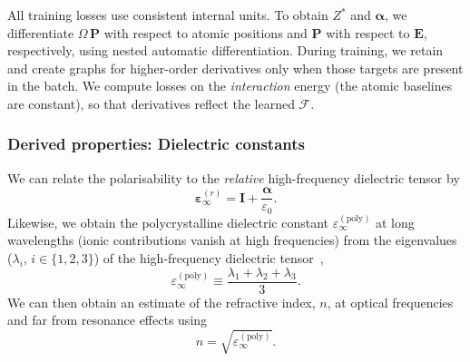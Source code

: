 \documentclass[aps,physrev,graphicx,amsmath,amssymb,
               reprint,superscriptaddress]{revtex4-2}
\begin{document}
All training losses use consistent internal units. To obtain $Z^*$ and $\boldsymbol\alpha$, we differentiate $\Omega\,\mathbf P$ with respect to atomic positions and $\mathbf P$ with respect to $\mathbf E$, respectively, using nested automatic differentiation. During training, we retain and create graphs for higher-order derivatives only when those targets are present in the batch. We compute losses on the \emph{interaction} energy (the atomic baselines are constant), so that derivatives reflect the learned $\mathcal F$.

\subsubsection{Derived properties: Dielectric constants}
\label{sec:dielectric_math}

We can relate the polarisability to the \emph{relative} high-frequency dielectric tensor by
\begin{equation}
\boldsymbol\varepsilon_\infty^{(r)} = \mathbf I + \frac{\boldsymbol\alpha}{\varepsilon_0}.
\label{eq:eps_from_alpha}
\end{equation}
Likewise, we obtain the polycrystalline dielectric constant $\varepsilon^{(\text{poly})}_\infty$ at long wavelengths (ionic contributions vanish at high frequencies) from the eigenvalues ($\lambda_i$, $i\in\{1,2,3\}$) of the high-frequency dielectric tensor~\cite{Petousis2017},
\begin{equation}
\varepsilon^{(\text{poly})}_\infty \equiv \frac{\lambda_1 + \lambda_2 + \lambda_3}{3}.
\label{eq:eps_poly}
\end{equation}
We can then obtain an estimate of the refractive index, $n$, at optical frequencies and far from resonance effects using
\begin{equation}
    n = \sqrt{\varepsilon^{(\text{poly})}_\infty}.
\label{eq:refractive_index}
\end{equation}
\end{document}
